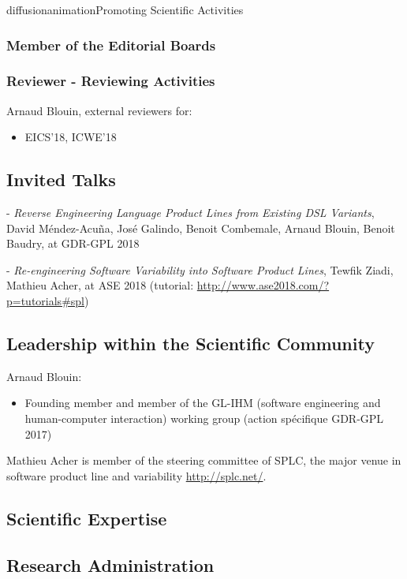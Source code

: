 \documentclass{ra2018}
\begin{document}
\begin{module}{diffusion}{animation}{Promoting Scientific Activities}
    \subsubsection{Member of the Editorial Boards}
    
    \subsubsection{Reviewer - Reviewing Activities}
 
 Arnaud Blouin, external reviewers for:
\begin{itemize}
    \item EICS'18, ICWE'18
\end{itemize}    
    
    
    \subsection{Invited Talks}

- \emph{Reverse Engineering Language Product Lines from Existing DSL Variants}, David Méndez-Acuña, José Galindo, Benoit Combemale, Arnaud Blouin, Benoit Baudry, at GDR-GPL 2018

- \emph{Re-engineering Software Variability into Software Product Lines}, Tewfik Ziadi, Mathieu Acher, at ASE 2018 (tutorial: \url{http://www.ase2018.com/?p=tutorials#spl})

    \subsection{Leadership within the Scientific Community}

\noindent Arnaud Blouin:
\begin{itemize}
	\item Founding member and member of the GL-IHM (software engineering and human-computer interaction) working group (action spécifique GDR-GPL 2017)
\end{itemize}

Mathieu Acher is member of the steering committee of SPLC, the major venue in software product line and variability \url{http://splc.net/}.

    \subsection{Scientific Expertise}
    
    \subsection{Research Administration}
  
\end{module}
\end{document}

